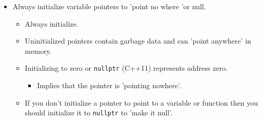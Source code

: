 \begin{itemize}
    \item Always initialize variable pointers to 'point no where 'or null.
        \begin{itemize}
            \item Always initialize.
            \item Uninitialized pointers contain garbage data and can 'point anywhere' in memory.
            \item Initializing to zero or \texttt{nullptr} (C++11) represents address zero.
                \begin{itemize}
                    \item Implies that the pointer is 'pointing nowhere'.
                \end{itemize}
            
            \item If you don't initialize a pointer to point to a variable or function then you should initialize it to \texttt{nullptr} to 'make it null'.
        \end{itemize}
\end{itemize}


